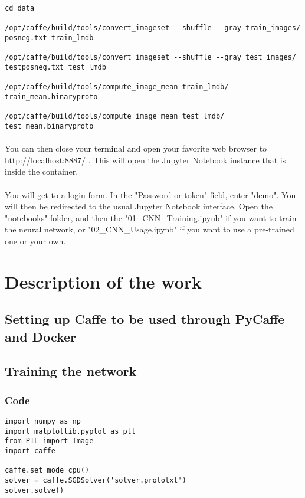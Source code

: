 \documentclass[french]{article}
\begin{document}
\begin{verbatim}
cd data

/opt/caffe/build/tools/convert_imageset --shuffle --gray train_images/ posneg.txt train_lmdb

/opt/caffe/build/tools/convert_imageset --shuffle --gray test_images/ testposneg.txt test_lmdb

/opt/caffe/build/tools/compute_image_mean train_lmdb/ train_mean.binaryproto

/opt/caffe/build/tools/compute_image_mean test_lmdb/ test_mean.binaryproto
\end{verbatim}

\paragraph{} You can then close your terminal and open your favorite web browser to http://localhost:8887/ . This will open the Jupyter Notebook instance that is inside the container.

\paragraph{} You will get to a login form. In the "Password or token" field, enter "demo". You will then be redirected to the usual Jupyter Notebook interface. Open the "notebooks" folder, and then the "01_CNN_Training.ipynb" if you want to train the neural network, or "02_CNN_Usage.ipynb" if you want to use a pre-trained one or your own.

\section{Description of the work}



\subsection{Setting up Caffe to be used through PyCaffe and Docker}

\subsection{Training the network}

\subsubsection{Code}

\begin{verbatim}
import numpy as np
import matplotlib.pyplot as plt
from PIL import Image
import caffe

caffe.set_mode_cpu()
solver = caffe.SGDSolver('solver.prototxt')
solver.solve()
\end{verbatim}
\end{document}
